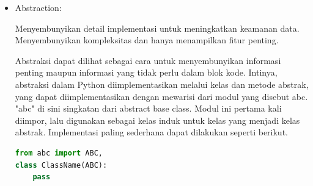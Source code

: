 \documentclass{article}
\begin{document}
\begin{itemize}
          Enkapsulasi juga digunakan untuk menyembunyikan data dan representasi internalnya. Istilah untuk hal ini adalah penyembunyian informasi. Python memiliki cara untuk mengatasinya, tetapi implementasinya lebih baik dalam bahasa pemrograman lain seperti Java dan C++. Modifier akses yang diwakili oleh kata kunci seperti public, private, dan protected digunakan untuk penyembunyian informasi. Penggunaan garis bawah tunggal dan ganda untuk tujuan ini di Python merupakan pengganti praktik tersebut. Misalnya, mari kita lihat contoh anggota yang dilindungi di Python.

          \begin{lstlisting}[language=Python, caption={}, captionpos=b]
class Alpha:
    
    def __init__(self):
        self._a = 2.  # Protected member 'a'
        self.__b = 2.  # Private member 'b'
          \end{lstlisting}

          \verb|self._a| adalah anggota terlindungi dan dapat diakses oleh kelas dan subkelasnya.

          Anggota pribadi dalam Python secara konvensional menggunakan dua garis bawah di depan: \verb|__. self.__b| adalah anggota pribadi dari kelas Alpha dan hanya dapat diakses dari dalam kelas Alpha.

          Perlu dicatat bahwa anggota privat dan terlindungi ini masih dapat diakses dari luar kelas dengan menggunakan metode publik untuk mengaksesnya atau melalui praktik yang dikenal sebagai \verb|name mangling|. Name mangling adalah penggunaan dua tanda underscore di depan dan satu tanda underscore di belakang, misalnya:

          \begin{lstlisting}[language=Python, caption={}, captionpos=b]
_class__identifier
           \end{lstlisting}

          Class adalah nama kelas dan identifier adalah anggota data yang ingin diakses.

    \item Abstraction:

          Menyembunyikan detail implementasi untuk meningkatkan keamanan data. Menyembunyikan kompleksitas dan hanya menampilkan fitur penting.

          Abstraksi dapat dilihat sebagai cara untuk menyembunyikan informasi penting maupun informasi yang tidak perlu dalam blok kode. Intinya, abstraksi dalam Python diimplementasikan melalui kelas dan metode abstrak, yang dapat diimplementasikan dengan mewarisi dari modul yang disebut abc. "abc" di sini singkatan dari abstract base class. Modul ini pertama kali diimpor, lalu digunakan sebagai kelas induk untuk kelas yang menjadi kelas abstrak. Implementasi paling sederhana dapat dilakukan seperti berikut.
          \begin{lstlisting}[language=Python, caption={}, captionpos=b]
from abc import ABC,   
class ClassName(ABC):
    pass
          \end{lstlisting}
\end{itemize}
\end{document}
